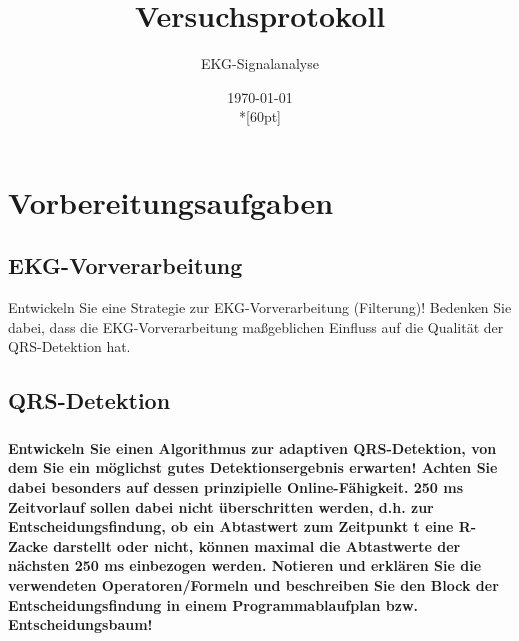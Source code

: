 \documentclass[a4paper,12pt,titlepage]{scrartcl}
\begin{document}
\titlehead
{
    \small
    {
        Technische Universität Ilmenau\\
        Fakulät IA\\
        Fachgebiet Biosignalverarbeitung\\

        Praktikum EKG-Signalanalyse\\
        WS 2021/22}
}

\title {Versuchsprotokoll}
\subtitle{EKG-Signalanalyse}
\author{}
\date{\today\\*[60pt]}
\maketitle  %

\pagestyle{fancy}
\newpage

\section{Vorbereitungsaufgaben}
\subsection{EKG-Vorverarbeitung}
Entwickeln Sie eine Strategie zur EKG-Vorverarbeitung (Filterung)! Bedenken Sie dabei, dass die EKG-Vorverarbeitung maßgeblichen Einfluss auf die Qualität der QRS-Detektion hat.

\subsection{QRS-Detektion}
\subsubsection{}
\textbf{Entwickeln Sie einen Algorithmus zur adaptiven QRS-Detektion, von dem Sie ein möglichst gutes Detektionsergebnis erwarten! Achten Sie dabei besonders auf dessen prinzipielle Online-Fähigkeit. 250 ms Zeitvorlauf sollen dabei nicht überschritten werden, d.h. zur Entscheidungsfindung, ob ein Abtastwert zum Zeitpunkt t eine R-Zacke darstellt oder nicht, können maximal die Abtastwerte der nächsten 250 ms einbezogen werden. Notieren und erklären Sie die verwendeten Operatoren/Formeln und beschreiben Sie den Block der Entscheidungsfindung in einem Programmablaufplan bzw. Entscheidungsbaum!}
\end{document}

